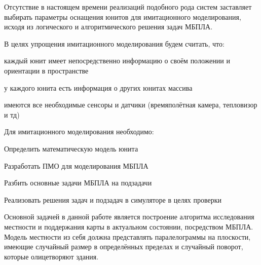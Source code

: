 Отсутствие в настоящем времени реализаций подобного рода систем заставляет
выбирать параметры оснащения юнитов для имитационного моделирования, исходя
из логического и алгоритмического решения задач МБПЛА.

В целях упрощения имитационного моделирования будем считать, что:

\begin{mintemize}
\item каждый юнит имеет непосредственно информацию о своём положении и ориентации в пространстве
\item у каждого юнита есть информация о других юнитах массива
\item имеются все необходимые сенсоры и датчики (времяполётная камера, тепловизор и тд)
\end{mintemize}

Для имитационного моделирования необходимо:

\begin{mintemize}
\item Определить математическую модель юнита
\item Разработать ПМО для моделирования МБПЛА
\item Разбить основные задачи МБПЛА на подзадачи
\item Реализовать решения задач и подзадач в симуляторе
      в целях проверки
\end{mintemize}

Основной задачей в данной работе является построение алгоритма исследования
местности и поддержания карты в актуальном состоянии, посредством МБПЛА.
Модель местности из себя должна представлять паралелограммы на плоскости,
имеющие случайный размер в определённых пределах и случайный поворот, которые
олицетворяют здания.
